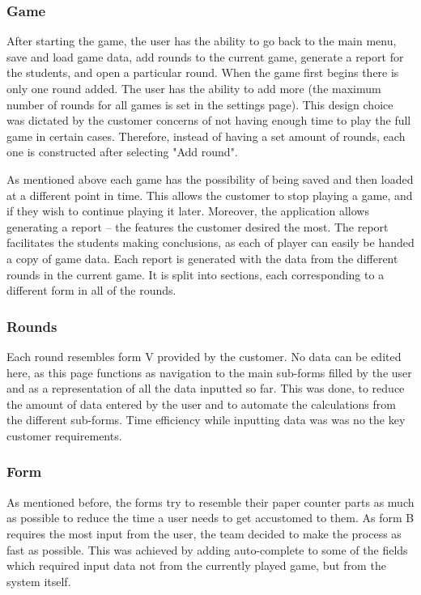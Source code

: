 \documentclass{l3proj}
\begin{document}
\subsubsection{Game}
After starting the game, the user has the ability to go back to the main menu, save and load game data, add rounds to the current game, generate a report for the students, and open a particular round. When the game first begins there is only one round added. The user has the ability to add more (the maximum number of rounds for all games is set in the settings page). This design choice was dictated by the customer concerns of not having enough time to play the full game in certain cases. Therefore, instead of having a set amount of rounds, each one is constructed after selecting "Add round".

As mentioned above each game has the possibility of being saved and then loaded at a different point in time. This allows the customer to stop playing a game, and if they wish to continue playing it later. Moreover, the application allows generating a report -- the features the customer desired the most. The report facilitates the students making conclusions, as each of player can easily be handed a copy of game data. Each report is generated with the data from the different rounds in the current game. It is split into sections, each corresponding to a different form in all of the rounds.


\subsubsection{Rounds}
Each round resembles form V provided by the customer. No data can be edited here, as this page functions as navigation to the main sub-forms filled by the user and as a representation of all the data inputted so far. This was done, to reduce the amount of data entered by the user and to automate the calculations from the different sub-forms. Time efficiency while inputting data was was no the key customer requirements.

\subsubsection{Form}
As mentioned before, the forms try to resemble their paper counter parts as much as possible to reduce the time a user needs to get accustomed to them. As form B requires the most input from the user, the team decided to make the process as fast as possible. This was achieved by adding auto-complete to some of the fields which required input data not from the currently played game, but from the system itself.
\end{document}
